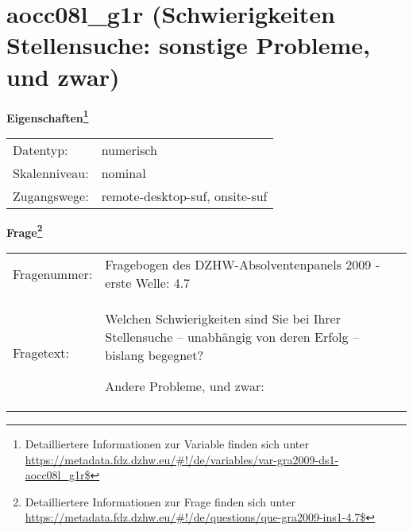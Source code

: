 
    \setcounter{footnote}{0}

    \vspace*{-1.8cm}
	\section{aocc08l\_g1r (Schwierigkeiten Stellensuche: sonstige Probleme, und zwar)}
	\label{section:aocc08l_g1r}



    \vspace*{0.5cm}
    \noindent\textbf{Eigenschaften\footnote{Detailliertere Informationen zur Variable finden sich unter
		\url{https://metadata.fdz.dzhw.eu/\#!/de/variables/var-gra2009-ds1-aocc08l_g1r$}}}\\
	\begin{tabularx}{\hsize}{@{}lX}
	Datentyp: & numerisch \\
	Skalenniveau: & nominal \\
	Zugangswege: &
	  remote-desktop-suf, 
	  onsite-suf
 \\
    \end{tabularx}



				\vspace*{0.5cm}
                \noindent\textbf{Frage\footnote{Detailliertere Informationen zur Frage finden sich unter
		              \url{https://metadata.fdz.dzhw.eu/\#!/de/questions/que-gra2009-ins1-4.7$}}}\\
				\begin{tabularx}{\hsize}{@{}lX}
					Fragenummer: &
					  Fragebogen des DZHW-Absolventenpanels 2009 - erste Welle:
					  4.7
 \\
					Fragetext: & Welchen Schwierigkeiten sind Sie bei Ihrer Stellensuche – unabhängig von deren Erfolg – bislang begegnet?\par  Andere Probleme, und zwar: \\
				\end{tabularx}






